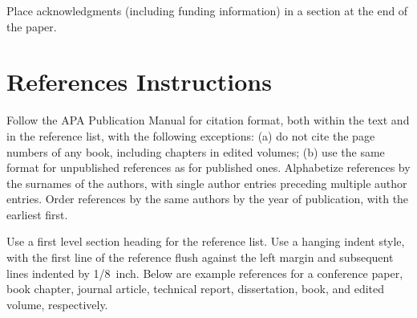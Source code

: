 \documentclass[10pt,letterpaper]{article}
\begin{document}
Place acknowledgments (including funding information) in a section at
the end of the paper.


\section{References Instructions}

Follow the APA Publication Manual for citation format, both within the
text and in the reference list, with the following exceptions: (a) do
not cite the page numbers of any book, including chapters in edited
volumes; (b) use the same format for unpublished references as for
published ones. Alphabetize references by the surnames of the authors,
with single author entries preceding multiple author entries. Order
references by the same authors by the year of publication, with the
earliest first.

Use a first level section heading for the reference list. Use a
hanging indent style, with the first line of the reference flush
against the left margin and subsequent lines indented by 1/8~inch.
Below are example references for a conference paper, book chapter,
journal article, technical report, dissertation, book, and edited
volume, respectively.

\nocite{ChalnickBillman1988a}
\nocite{Feigenbaum1963a}
\nocite{Hill1983a}
\nocite{OhlssonLangley1985a}
\nocite{Lewis1978a}
\nocite{NewellSimon1972a}
\nocite{ShragerLangley1990a}




\setlength{\bibleftmargin}{.125in}
\setlength{\bibindent}{-\bibleftmargin}


\end{document}
